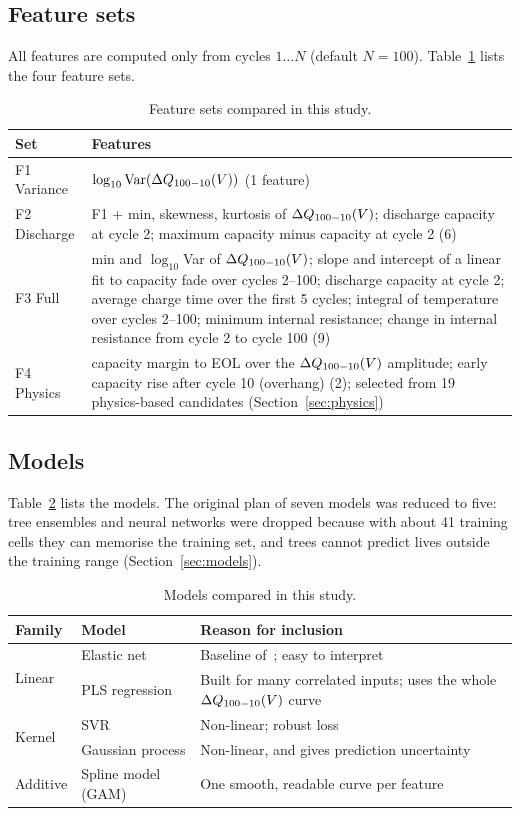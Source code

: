 \subsection{Feature sets}
All features are computed only from cycles $1\ldots N$ (default $N=100$).
Table~\ref{tab:featsets} lists the four feature sets.

\begin{table}[t]
\centering
\caption{Feature sets compared in this study.}
\label{tab:featsets}
\setlength{\tabcolsep}{3pt}
\begin{tabular}{@{}lp{}@{}}
\toprule
Set & Features \\
\midrule
F1 Variance & $\log_{10}\mathrm{Var}(\Delta Q_{100-10}(V))$ (1 feature)~\cite{severson2019} \\
F2 Discharge & F1 + min, skewness, kurtosis of $\Delta Q_{100-10}(V)$; discharge capacity at
cycle 2; maximum capacity minus capacity at cycle 2 (6)~\cite{severson2019} \\
F3 Full & min and $\log_{10}$Var of $\Delta Q_{100-10}(V)$; slope and intercept of a linear
fit to capacity fade over cycles 2--100; discharge capacity at cycle 2;
average charge time over the first 5 cycles; integral of temperature over
cycles 2--100; minimum internal resistance; change in internal resistance
from cycle 2 to cycle 100 (9)~\cite{severson2019} \\
F4 Physics & capacity margin to EOL over the $\Delta Q_{100-10}(V)$ amplitude; early
capacity rise after cycle 10 (overhang) (2); selected from 19 physics-based
candidates (Section~\ref{sec:physics}) \\
\bottomrule
\end{tabular}
\end{table}

\subsection{Models}
Table~\ref{tab:models} lists the models. The original plan of seven models
was reduced to five: tree ensembles and neural networks were dropped because
with about 41 training cells they can memorise the training set, and trees
cannot predict lives outside the training range (Section~\ref{sec:models}).

\begin{table}[t]
\centering
\caption{Models compared in this study.}
\label{tab:models}
\setlength{\tabcolsep}{3pt}
\begin{tabular}{@{}llp{}@{}}
\toprule
Family & Model & Reason for inclusion \\
\midrule
\multirow{2}{*}{Linear} & Elastic net & Baseline of~\cite{severson2019}; easy to interpret \\
 & PLS regression & Built for many correlated inputs; uses the whole $\Delta Q_{100-10}(V)$ curve \\
\midrule
\multirow{2}{*}{Kernel} & SVR & Non-linear; robust loss \\
 & Gaussian process & Non-linear, and gives prediction uncertainty \\
\midrule
Additive & Spline model (GAM) & One smooth, readable curve per feature \\
\bottomrule
\end{tabular}
\end{table}


